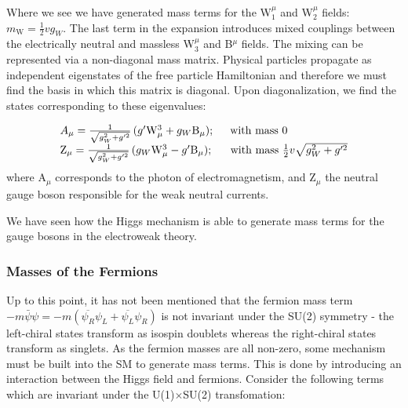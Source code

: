 Where we see we have generated mass terms for the W$^{\mu}_{1}$ and W$^{\mu}_{2}$ fields:  $m_{\mathrm{W}} = \frac{1}{2} v g_{W}$. The last term in the expansion introduces mixed couplings between the electrically neutral and massless W$_{3}^{\mu}$ and B$^{\mu}$ fields. The mixing can be represented via a non-diagonal mass matrix. Physical particles propagate as independent eigenstates of the free particle Hamiltonian and therefore we must find the basis in which this matrix is diagonal. Upon diagonalization, we find the states corresponding to these eigenvalues:

\begin{equation}
\begin{array}{l}
A_{\mu} = \frac{1}{\sqrt{g_{W}^{2} + g'^{2}}} \, (g' \mathrm{W}^{3}_{\mu} + g_{W}\mathrm{B}_{\mu});\hspace{0.5cm} \mathrm{with\,\,mass}\,\,0\\
\mathrm{Z}_{\mu} = \frac{1}{\sqrt{g_{W}^{2} + g'^{2}}} \, (g_{W} \mathrm{W}^{3}_{\mu} - g'\mathrm{B}_{\mu}); \hspace{0.56cm} \mathrm{with\,\,mass}\,\, \frac{1}{2}v\sqrt{g_{W}^{2} + g'^{2}}
\end{array}
\end{equation}
where $\mathrm{A}_{\mu}$ corresponds to the photon of electromagnetism, and Z$_{\mu}$ the neutral gauge boson responsible for the weak neutral currents.

We have seen how the Higgs mechanism is able to generate mass terms for the gauge bosons in the electroweak theory.

\subsubsection{Masses of the Fermions}

Up to this point, it has not been mentioned that the fermion mass term $-m\bar{\psi}\psi = - m ( \overline{\psi_{R}} \psi_{L} + \overline{\psi_{L}}\psi_{R})$ is not invariant under the SU(2) symmetry - the left-chiral states transform as isospin doublets whereas the right-chiral states transform as singlets. As the fermion masses are all non-zero, some mechanism must be built into the SM to generate mass terms. This is done by introducing an interaction between the Higgs field and fermions. Consider the following terms which are invariant under the U(1)$\times$SU(2) transfomation:


